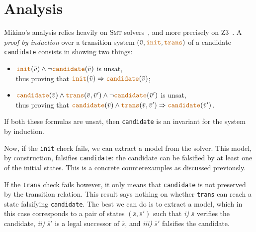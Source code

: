\documentclass{easychair}
\newcommand{\Mkn}{Mikino}
\newcommand{\mkn}{mikino}
\newcommand{\smt}{\textsc{Smt}}
\newcommand{\presecspace}{\vspace{-.3cm}}
\newcommand{\ita}[1]{\textit{#1}}
\newcommand{\code}[1]{\textcolor{orange!75!black}{\texttt{#1}}}
\newcommand{\vars}{\bar{v}}
\newcommand{\state}{\bar{s}}
\newcommand{\init}{\code{init}}
\newcommand{\trans}{\code{trans}}
\newcommand{\cand}{\code{candidate}}
\newcommand{\true}{\code{true}}
\newcommand{\impl}{\Rightarrow}
\begin{document}
\presecspace{}
\section{Analysis}%
\label{sec:analysis}

\Mkn{}'s analysis relies heavily on \smt{} solvers~\cite{smt}, and more precisely on Z3~\cite{z3}.
%
A \ita{proof by induction} over a transition system \((\vars, \init, \trans)\) of a candidate
\cand{} consists in showing two things:
%
\vspace{-.2cm}
\begin{itemize}\itemsep0em
    \item \(\init(\vars) \land \neg \cand(\vars)\) is unsat,\\
        thus proving that \(\init(\vars) \impl \cand(\vars)\);
    \item \(\cand(\vars) \land \trans(\vars, \vars') \land \neg \cand(\vars')\) is unsat,\\
        thus proving that \(\cand(\vars) \land \trans(\vars, \vars') \impl \cand(\vars')\).
\end{itemize}
%
If both these formulas are unsat, then \cand{} is an invariant for the system by induction.

\smallskip{}

Now, if the \init{} check fails, we can extract a model from the solver. This model, by
construction, falsifies \cand{}: the candidate can be falsified by at least one of the initial
states. This is a concrete counterexamples as discussed previously.

If the \trans{} check fails however, it only means that \cand{} is not preserved by the transition
relation. This result says nothing on whether \trans{} can reach a state falsifying \cand{}. The
best we can do is to extract a model, which in this case corresponds to a pair of states \((\state,
\state')\) such that \ita{i)} \(\state\) verifies the candidate, \ita{ii)} \(\state'\) is a legal
successor of \(\state\), and \ita{iii)} \(\state'\) falsifies the candidate.
\end{document}
